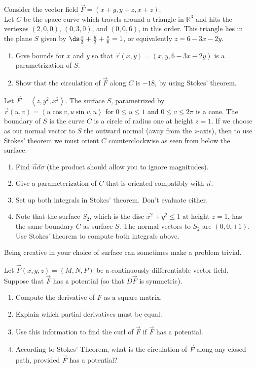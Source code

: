 \begin{problem}
Consider the vector field $\vec F = \left(x+y, y+z, x+z\right)$.\\ 
Let $C$ be the space curve which travels around a triangle in $\mathbb{R}^3$ and hits the vertexes $(2,0,0)$, $(0,3,0)$, and $(0,0,6)$, in this order. 
This triangle lies in the plane $S$ given by $\ds \frac x2+\frac y3 +\frac z6=1$, or equivalently $z=6-3x-2y$. 
\begin{enumerate}
 \item Give bounds for $x$ and $y$ so that $\vec r(x,y)=(x,y,6-3x-2y)$ is a parametrization of $S$.
 \item Show that the circulation of $\vec F$ along $C$ is $-18$, by using Stokes' theorem.
\end{enumerate}
\end{problem}


\begin{problem}
Let $\vec F = \left<z,y^2,x^2\right>$. The surface $S$, parametrized by $\vec r(u,v) = \left<u\cos v,u\sin v, u\right>$ for $0\leq u\leq 1$ and $0\leq v\leq 2\pi$ is a cone. The boundary of $S$ is the curve $C$ is a circle of radius one at height $z=1$. If we choose as our normal vector to $S$ the outward normal (away from the $z$-axis), then to use Stokes' theorem we must orient $C$ counterclockwise as seen from below the surface. 
\begin{enumerate}
 \item Find $\vec n d\sigma$ (the product should allow you to ignore magnitudes). 
 \item Give a parameterization of $C$ that is oriented compatibly with $\vec n$.
 \item Set up both integrals in Stokes' theorem. Don't evaluate either.
 \item Note that the surface $S_2$, which is the disc $x^2+y^2\leq 1$ at height $z=1$, has the same boundary $C$ as surface $S$. The normal vectors to $S_2$ are $(0,0,\pm 1)$. Use Stokes' theorem to compute both integrals above. 
\end{enumerate}
Being creative in your choice of surface can sometimes make a problem trivial.
\end{problem}

\begin{problem}
Let $\vec F(x,y,z)=(M,N,P)$ be a continuously differentiable vector field. Suppose that $\vec F$ has a potential (so that $D\vec F$ is symmetric).
\begin{enumerate}
	\item Compute the derivative of $F$ as a square matrix. 
	\item Explain which partial derivatives must be equal. 
	\item Use this information to find the curl of $\vec F$ if $\vec F$ has a potential. 
	\item According to Stokes' Theorem, what is the circulation of $\vec F$ along any closed path, provided $\vec F$ has a potential?
\end{enumerate}
\end{problem}


